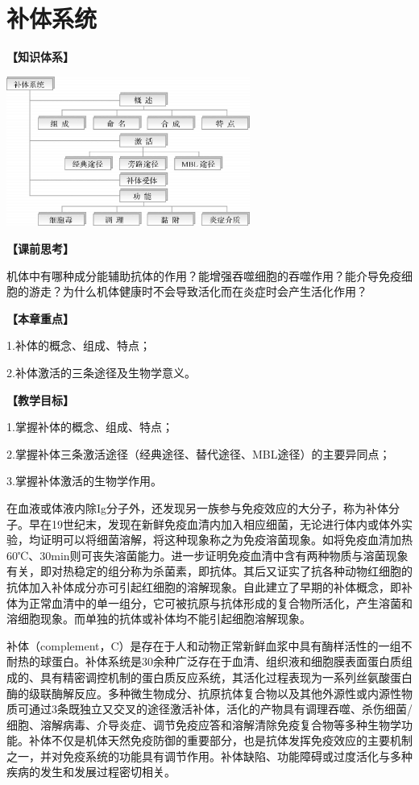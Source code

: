 \chapter{补体系统}
\begin{framed}
    \noindent\textbf{【知识体系】}
\begin{center}
    \includegraphics[width=0.6\textwidth]{./images/Image00078.jpg}
\end{center}

\noindent\textbf{【课前思考】}

机体中有哪种成分能辅助抗体的作用？能增强吞噬细胞的吞噬作用？能介导免疫细胞的游走？为什么机体健康时不会导致活化而在炎症时会产生活化作用？

\noindent\textbf{【本章重点】}

1.补体的概念、组成、特点；

2.补体激活的三条途径及生物学意义。

\noindent\textbf{【教学目标】}

1.掌握补体的概念、组成、特点；

2.掌握补体三条激活途径（经典途径、替代途径、MBL途径）的主要异同点；

3.掌握补体激活的生物学作用。
\end{framed}

在血液或体液内除Ig分子外，还发现另一族参与免疫效应的大分子，称为补体分子。早在19世纪末，发现在新鲜免疫血清内加入相应细菌，无论进行体内或体外实验，均证明可以将细菌溶解，将这种现象称之为免疫溶菌现象。如将免疫血清加热60℃、30min则可丧失溶菌能力。进一步证明免疫血清中含有两种物质与溶菌现象有关，即对热稳定的组分称为杀菌素，即抗体。其后又证实了抗各种动物红细胞的抗体加入补体成分亦可引起红细胞的溶解现象。自此建立了早期的补体概念，即补体为正常血清中的单一组分，它可被抗原与抗体形成的复合物所活化，产生溶菌和溶细胞现象。而单独的抗体或补体均不能引起细胞溶解现象。

补体（complement，C）是存在于人和动物正常新鲜血浆中具有酶样活性的一组不耐热的球蛋白。补体系统是30余种广泛存在于血清、组织液和细胞膜表面蛋白质组成的、具有精密调控机制的蛋白质反应系统，其活化过程表现为一系列丝氨酸蛋白酶的级联酶解反应。多种微生物成分、抗原抗体复合物以及其他外源性或内源性物质可通过3条既独立又交叉的途径激活补体，活化的产物具有调理吞噬、杀伤细菌/细胞、溶解病毒、介导炎症、调节免疫应答和溶解清除免疫复合物等多种生物学功能。补体不仅是机体天然免疫防御的重要部分，也是抗体发挥免疫效应的主要机制之一，并对免疫系统的功能具有调节作用。补体缺陷、功能障碍或过度活化与多种疾病的发生和发展过程密切相关。

